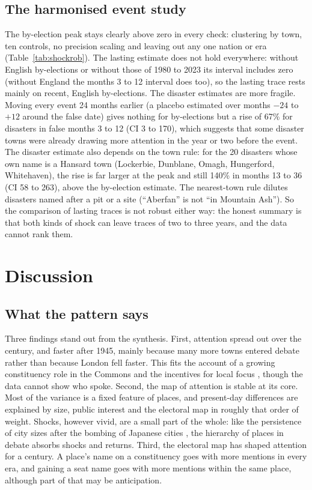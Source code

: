 \documentclass[11pt,a4paper]{article}
\begin{document}
\subsection{The harmonised event study}
The by-election peak stays clearly above zero in every check: clustering by town, ten controls, no precision scaling and leaving out any one nation or era (Table~\ref{tab:shockrob}). The lasting estimate does not hold everywhere: without English by-elections or without those of 1980 to 2023 its interval includes zero (without England the months 3 to 12 interval does too), so the lasting trace rests mainly on recent, English by-elections. The disaster estimates are more fragile. Moving every event 24 months earlier (a placebo estimated over months $-24$ to $+12$ around the false date) gives nothing for by-elections but a rise of 67\% for disasters in false months 3 to 12 (CI 3 to 170), which suggests that some disaster towns were already drawing more attention in the year or two before the event. The disaster estimate also depends on the town rule: for the 20 disasters whose own name is a Hansard town (Lockerbie, Dunblane, Omagh, Hungerford, Whitehaven), the rise is far larger at the peak and still 140\% in months 13 to 36 (CI 58 to 263), above the by-election estimate. The nearest-town rule dilutes disasters named after a pit or a site (``Aberfan'' is not ``in Mountain Ash''). So the comparison of lasting traces is not robust either way: the honest summary is that both kinds of shock can leave traces of two to three years, and the data cannot rank them.

\section{Discussion}\label{sec:disc}
\subsection{What the pattern says}
Three findings stand out from the synthesis. First, attention spread out over the century, and faster after 1945, mainly because many more towns entered debate rather than because London fell faster. This fits the account of a growing constituency role in the Commons \citep{norton1994,nortonwood1993} and the incentives for local focus \citep{cain1987}, though the data cannot show who spoke. Second, the map of attention is stable at its core. Most of the variance is a fixed feature of places, and present-day differences are explained by size, public interest and the electoral map in roughly that order of weight. Shocks, however vivid, are a small part of the whole: like the persistence of city sizes after the bombing of Japanese cities \citep{davis2002}, the hierarchy of places in debate absorbs shocks and returns. Third, the electoral map has shaped attention for a century. A place's name on a constituency goes with more mentions in every era, and gaining a seat name goes with more mentions within the same place, although part of that may be anticipation.
\end{document}
